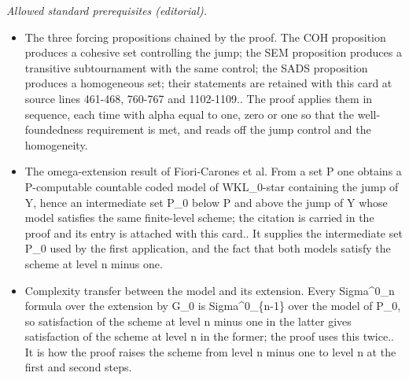 \documentclass{article}
\numberwithin{theorem}{section}
\newtheorem{proposition}[theorem]{Proposition}
\newcommand{\RCA}{\mathsf{RCA}}
\newcommand{\BSig}{\mathsf{B}\Sigma^0}
\newcommand{\WF}{\mathsf{WF}}
\newcommand{\M}{\mathcal{M}}
\begin{document}
\noindent\textit{Allowed standard prerequisites (editorial).}\begin{itemize}
\item The three forcing propositions chained by the proof. The COH proposition produces a cohesive set controlling the jump; the SEM proposition produces a transitive subtournament with the same control; the SADS proposition produces a homogeneous set; their statements are retained with this card at source lines 461-468, 760-767 and 1102-1109.. The proof applies them in sequence, each time with alpha equal to one, zero or one so that the well-foundedness requirement is met, and reads off the jump control and the homogeneity.
\item The omega-extension result of Fiori-Carones et al. From a set P one obtains a P-computable countable coded model of WKL\_0-star containing the jump of Y, hence an intermediate set P\_0 below P and above the jump of Y whose model satisfies the same finite-level scheme; the citation is carried in the proof and its entry is attached with this card.. It supplies the intermediate set P\_0 used by the first application, and the fact that both models satisfy the scheme at level n minus one.
\item Complexity transfer between the model and its extension. Every Sigma\textasciicircum{}0\_n formula over the extension by G\_0 is Sigma\textasciicircum{}0\_\{n-1\} over the model of P\_0, so satisfaction of the scheme at level n minus one in the latter gives satisfaction of the scheme at level n in the former; the proof uses this twice.. It is how the proof raises the scheme from level n minus one to level n at the first and second steps.
\end{itemize}\medskip
{}
\end{document}
